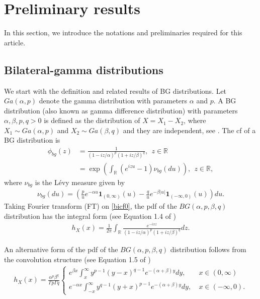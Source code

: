 \documentclass[12pt, a4paper,reqno]{amsart}
\theoremstyle{definition}
\theoremstyle{myremark}
\numberwithin{equation}{section}
\begin{document}
\section{Preliminary results}\label{nopre}
\noindent
In this section, we introduce the notations and preliminaries required for this article.
\subsection{Bilateral-gamma distributions}\label{prebg}
We start with the definition and related results of BG distributions. Let $Ga(\alpha,p)$ denote the gamma distribution with parameters $\alpha$ and $p$. A BG distribution (also known as gamma difference distribution) with parameters $\alpha,\beta,p,q>0$ is defined as the distribution of $X=X_1-X_2$, where $X_1\sim Ga(\alpha,p)$ and $X_2\sim Ga(\beta,q)$ and they are independent, see \cite{gamdiff}. The cf of a BG distribution is 
\begin{align}
\phi_{bg}(z)&= \frac{1}{(1 -iz/\alpha)^p (1 +iz/\beta)^q} ,~~z\in\mathbb{R}\label{bicf0}\\
&=\exp\left(\int_{\mathbb{R}}(e^{izu}-1)\nu_{bg}(du)  \right),~~z\in\mathbb{R},\label{e1}
\end{align}
\noindent
where $\nu_{bg}$ is the L\'evy measure given by
\begin{align}\label{bglevymeasure}
\nu_{bg}(du)=\left(\frac{p  }{u}e^{-\alpha u}\mathbf{1}_{(0,\infty)}(u)-\frac{q  }{u}e^{-\beta|u|}\mathbf{1}_{(-\infty,0)}(u)\right)du.
\end{align}
\noindent
Taking Fourier transform (FT) on \eqref{bicf0}, the pdf of the $BG(\alpha,p,\beta,q)$ distribution has the integral form (see Equation 1.4 of \cite{gamdiff})
\begin{align}
h_X(x)=\frac{1}{2\pi}\displaystyle\int_{\mathbb{R}}\frac{e^{-ixz}}{(1-iz/\alpha)^{p} (1+iz/\beta)^{q}}dz.
\end{align}


\noindent
An alternative form of the pdf of the $BG(\alpha,p,\beta,q)$ distribution follows from the convolution structure (see Equation 1.5 of \cite{gamdiff})
\begin{align}\label{newref02}
h_X(x)=\frac{\alpha^{p} \beta^{q}}{\Gamma p \Gamma q} \begin{cases}
e^{\beta x}\int_{x}^{\infty}y^{p-1}(y-x)^{q-1}e^{-(\alpha+\beta)y}dy  ,&~x\in(0,\infty)\\
e^{-\alpha x}\int_{-x}^{\infty}y^{q-1}(y+x)^{p-1}e^{-(\alpha+\beta)y}dy  ,&~x\in(-\infty,0).
\end{cases}
\end{align}
\end{document}
